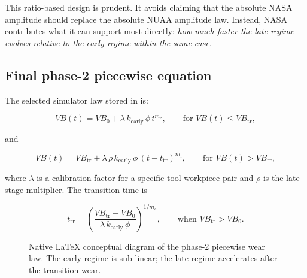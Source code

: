 \documentclass[11pt,a4paper]{article}
\newcommand{\vb}{V\!B}
\newcommand{\vbf}{V\!B_{\mathrm{f}}}
\newcommand{\vbtr}{V\!B_{\mathrm{tr}}}
\newcommand{\ttr}{t_{\mathrm{tr}}}
\newcommand{\phii}{\phi}
\newcommand{\earlyexp}{m_{\mathrm{e}}}
\newcommand{\lateexp}{m_{\mathrm{l}}}
\begin{document}
This ratio-based design is prudent. It avoids claiming that the absolute NASA amplitude should replace the absolute
NUAA amplitude law. Instead, NASA contributes what it can support most directly: \emph{how much faster the late
regime evolves relative to the early regime within the same case}.

\subsection{Final phase-2 piecewise equation}

The selected simulator law stored in  is:

\begin{equation}
\vb(t) = \vb_0 + \lambda \, k_{\mathrm{early}} \, \phii \, t^{\earlyexp},
\qquad \text{for } \vb(t) \le \vbtr,
\label{eq:early-final}
\end{equation}

and

\begin{equation}
\vb(t) = \vbtr + \lambda \, \rho \, k_{\mathrm{early}} \, \phii \, (t-\ttr)^{\lateexp},
\qquad \text{for } \vb(t) > \vbtr,
\label{eq:late-final}
\end{equation}

where \(\lambda\) is a calibration factor for a specific tool-workpiece pair and \(\rho\) is the
late-stage multiplier. The transition time is

\begin{equation}
\ttr =
\left(
\frac{\vbtr - \vb_0}{\lambda \, k_{\mathrm{early}} \, \phii}
\right)^{1/\earlyexp},
\qquad \text{when } \vbtr > \vb_0.
\label{eq:ttr}
\end{equation}

\begin{figure}[H]
\centering
{}
\caption{Native LaTeX conceptual diagram of the phase-2 piecewise wear law. The early regime is sub-linear; the late regime accelerates after the transition wear.}
\label{fig:piecewise-diagram}
\end{figure}
\end{document}
